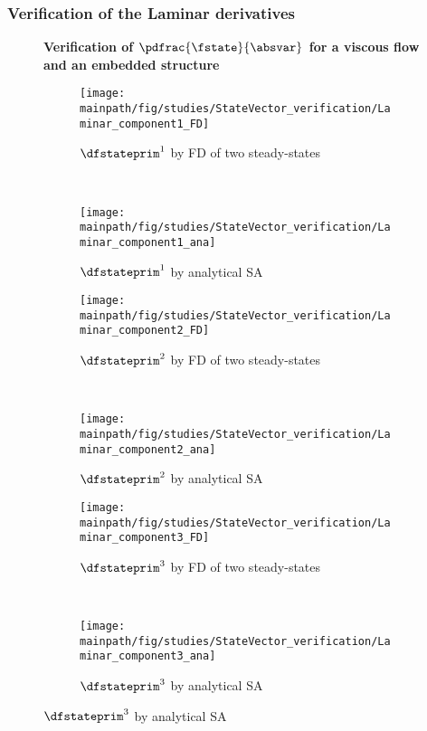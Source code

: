 \documentclass[../main.tex]{subfiles}
\begin{document}
\subsubsection{Verification of the Laminar derivatives}
\begin{figure*}[t!]
    \centering

    \textbf{Verification of $\pdfrac{\fstate}{\absvar}$ for a viscous flow and an embedded structure}\par\medskip    
    
    \begin{subfigure}[t]{0.5\textwidth}
        \centering
        \texttt{[image: \\mainpath/fig/studies/StateVector\_verification/Laminar\_component1\_FD]}
        \caption{$\dfstateprim^1$ by \ac{FD} of two steady-states}
    \end{subfigure}%
    ~ 
    \begin{subfigure}[t]{0.5\textwidth}
        \centering
        \texttt{[image: \\mainpath/fig/studies/StateVector\_verification/Laminar\_component1\_ana]}
        \caption{$\dfstateprim^1$ by analytical \ac{SA}}
    \end{subfigure}
    
    
    \begin{subfigure}[t]{0.5\textwidth}
        \centering
        \texttt{[image: \\mainpath/fig/studies/StateVector\_verification/Laminar\_component2\_FD]}
        \caption{$\dfstateprim^2$ by \ac{FD} of two steady-states}
    \end{subfigure}%
    ~ 
    \begin{subfigure}[t]{0.5\textwidth}
        \centering
        \texttt{[image: \\mainpath/fig/studies/StateVector\_verification/Laminar\_component2\_ana]}
        \caption{$\dfstateprim^2$ by analytical \ac{SA}}
    \end{subfigure}
    
    
    \begin{subfigure}[t]{0.5\textwidth}
        \centering
        \texttt{[image: \\mainpath/fig/studies/StateVector\_verification/Laminar\_component3\_FD]}
        \caption{$\dfstateprim^3$ by \ac{FD} of two steady-states}
    \end{subfigure}%
    ~ 
    \begin{subfigure}[t]{0.5\textwidth}
        \centering
        \texttt{[image: \\mainpath/fig/studies/StateVector\_verification/Laminar\_component3\_ana]}
        \caption{$\dfstateprim^3$ by analytical \ac{SA}}
    \end{subfigure}
    

\end{figure*}
\end{document}
